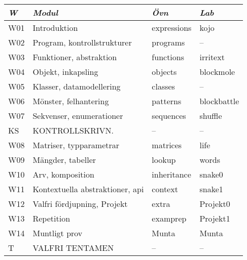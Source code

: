 \begin{tabular}{l|l|l|l}
\textit{W} & \textit{Modul} & \textit{Övn} & \textit{Lab} \\ \hline \hline
W01 & Introduktion & expressions & kojo \\
W02 & Program, kontrollstrukturer & programs & -- \\
W03 & Funktioner, abstraktion & functions & irritext \\
W04 & Objekt, inkapsling & objects & blockmole \\
W05 & Klasser, datamodellering & classes & -- \\
W06 & Mönster, felhantering & patterns & blockbattle \\
W07 & Sekvenser, enumerationer & sequences & shuffle \\
KS & KONTROLLSKRIVN. & -- & -- \\
W08 & Matriser, typparametrar & matrices & life \\
W09 & Mängder, tabeller & lookup & words \\
W10 & Arv, komposition & inheritance & snake0 \\
W11 & Kontextuella abstraktioner, api & context & snake1 \\
W12 & Valfri fördjupning, Projekt & extra & Projekt0 \\
W13 & Repetition & examprep & Projekt1 \\
W14 & Muntligt prov & Munta & Munta \\
T & VALFRI TENTAMEN & -- & -- \\
\end{tabular}
